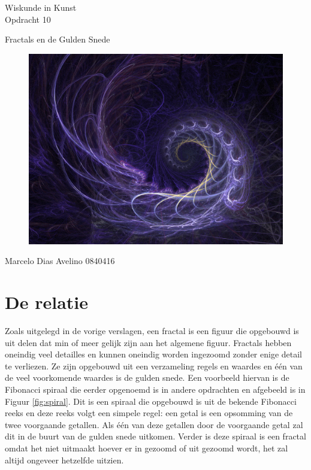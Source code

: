\documentclass{article}
\begin{document}
\begin{center}
	\huge{Wiskunde in Kunst}\\
	\LARGE{Opdracht 10} \\
	
	\vspace{2cm}
	
	\Large{Fractals en de Gulden Snede}\\
	
	\vfill
	
	\begin{figure}[Hh]
		\centering
		\includegraphics[width=\textwidth]{Golden_Ratio.jpg}
	\end{figure}
	
	\vfill
	\Large{Marcelo Dias Avelino} \hfill \large{0840416}
\end{center}

\thispagestyle{empty} %

\pagebreak

\setcounter{page}{1} %

\section{De relatie}

Zoals uitgelegd in de vorige verslagen, een fractal is een figuur die opgebouwd is uit delen dat min of meer gelijk zijn aan het algemene figuur. Fractals hebben oneindig veel detailles en kunnen oneindig worden ingezoomd zonder enige detail te verliezen. Ze zijn opgebouwd uit een verzameling regels en waardes en \'e\'en van de veel voorkomende waardes is de gulden snede. Een voorbeeld hiervan is de Fibonacci spiraal die eerder opgenoemd is in andere opdrachten en afgebeeld is in Figuur \ref{fig:spiral}. Dit is een spiraal die opgebouwd is uit de bekende Fibonacci reeks en deze reeks volgt een simpele regel: een getal is een opsomming van de twee voorgaande getallen. Als \'e\'en van deze getallen door de voorgaande getal zal dit in de buurt van de gulden snede uitkomen. Verder is deze spiraal is een fractal omdat het niet uitmaakt hoever er in gezoomd of uit gezoomd wordt, het zal altijd ongeveer hetzelfde uitzien. 
\end{document}
